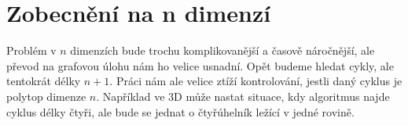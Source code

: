\chapter{Zobecnění na n dimenzí}
\label{chap:n_dimenzi}

Problém v $n$ dimenzích bude trochu komplikovanější a časově náročnější, ale převod na grafovou úlohu nám ho velice usnadní. Opět budeme hledat cykly, ale tentokrát délky $n+1$. Práci nám ale velice ztíží kontrolování, jestli daný cyklus je polytop dimenze $n$. Například ve 3D může nastat situace, kdy algoritmus najde cyklus délky čtyři, ale bude se jednat o čtyřúhelník ležící v jedné rovině. 



